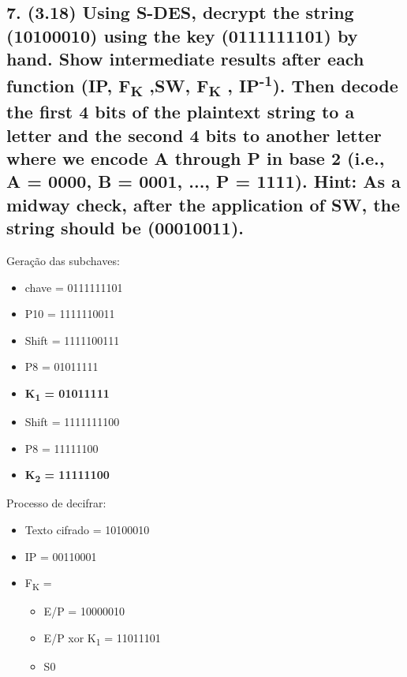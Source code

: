 \documentclass[12pt]{article}
\begin{document}
\subsection*{7. (3.18) Using S-DES, decrypt the string (10100010) using the key
(0111111101) by hand. Show intermediate results after each function (IP, F\textsubscript{K}
,SW, F\textsubscript{K} , IP\textsuperscript{-1}). Then decode the first 4 bits of the
plaintext string to a letter and the second 4 bits to another letter where we
encode A through P in base 2 (i.e., A = 0000, B = 0001, ..., P = 1111). Hint: As
a midway check, after the application of SW, the string should be (00010011).}

Geração das subchaves:
\begin{itemize}
  \item chave = 0111111101
  \item P10 = 1111110011
  \item Shift = 1111100111
  \item P8 = 01011111
  \item \textbf{K\textsubscript{1} = 01011111}
  \item Shift = 1111111100
  \item P8 = 11111100
  \item \textbf{K\textsubscript{2} = 11111100}
\end{itemize}

Processo de decifrar:
\begin{itemize}
  \item Texto cifrado = 10100010
  \item IP = 00110001
  \item F\textsubscript{K} =
  \begin{itemize}
    \item E/P = 10000010
    \item E/P xor K\textsubscript{1} = 11011101
    \item S0
  \end{itemize}
\end{itemize}
\end{document}
